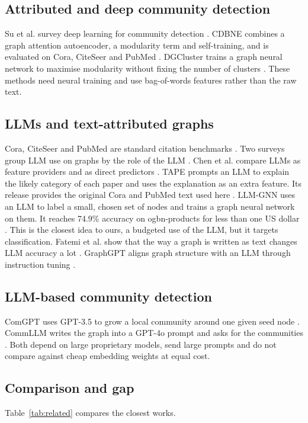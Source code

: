 \documentclass[journal]{IEEEtran}
\begin{document}
\subsection{Attributed and deep community detection}
Su et al. survey deep learning for community detection \cite{su2024}. CDBNE combines a graph attention autoencoder, a modularity term and self-training, and is evaluated on Cora, CiteSeer and PubMed \cite{zhou2023}. DGCluster trains a graph neural network to maximise modularity without fixing the number of clusters \cite{bhowmick2024}. These methods need neural training and use bag-of-words features rather than the raw text.

\subsection{LLMs and text-attributed graphs}
Cora, CiteSeer and PubMed are standard citation benchmarks \cite{sen2008}. Two surveys group LLM use on graphs by the role of the LLM \cite{jin2024,li2024}. Chen et al. compare LLMs as feature providers and as direct predictors \cite{chen2024explor}. TAPE prompts an LLM to explain the likely category of each paper and uses the explanation as an extra feature. Its release provides the original Cora and PubMed text used here \cite{he2024}. LLM-GNN uses an LLM to label a small, chosen set of nodes and trains a graph neural network on them. It reaches 74.9\% accuracy on ogbn-products for less than one US dollar \cite{chen2024llmgnn}. This is the closest idea to ours, a budgeted use of the LLM, but it targets classification. Fatemi et al. show that the way a graph is written as text changes LLM accuracy a lot \cite{fatemi2024}. GraphGPT aligns graph structure with an LLM through instruction tuning \cite{tang2024}.

\subsection{LLM-based community detection}
ComGPT uses GPT-3.5 to grow a local community around one given seed node \cite{ni2026}. CommLLM writes the graph into a GPT-4o prompt and asks for the communities \cite{gujral2025}. Both depend on large proprietary models, send large prompts and do not compare against cheap embedding weights at equal cost.

\subsection{Comparison and gap}
Table~\ref{tab:related} compares the closest works.
\end{document}
